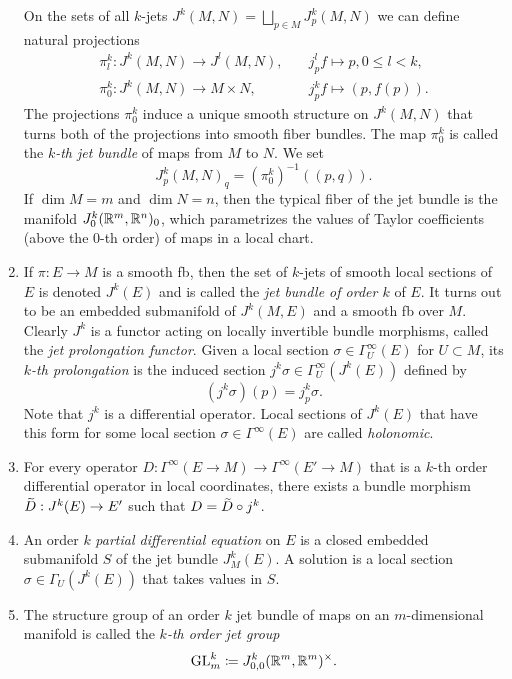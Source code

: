 \begin{defn}
\begin{enumerate}
        On the sets of all $k$-jets $J^k(M,N)=\bigsqcup_{p\in M}J^k_p(M,N)$ we can define natural projections
        \begin{align}
            \pi^k_l:J^k(M,N)\to J^l(M,N),&\quad  j_p^l f\mapsto p, 0\leq l<k,\\
            \pi^k_0:J^k(M,N)\to M\times N,&\quad j_p^k f\mapsto (p,f(p)).
        \end{align}
        The projections $\pi^k_0$ induce a unique smooth structure on $J^k(M,N)$ that turns both of the projections into smooth fiber bundles. The map $\pi^k_0$ is called the \emph{$k$-th jet bundle} of maps from $M$ to $N$.
        We set
        \[J^k_{p}(M,N)_q=(\pi^k_0)^{-1}((p,q)).\]
        If $\dim M=m$ and $\dim N=n$, then the typical fiber of the jet bundle is the manifold $J^k_{0}(\mathbb{R}^m,\mathbb{R}^n)_0$, which parametrizes the values of Taylor coefficients (above the $0$-th order) of maps in a local chart.
        \item If $\pi:E\to M$ is a smooth \gls{fb}, then the set of $k$-jets of smooth local sections of $E$ is denoted $J^k(E)$ and is called the \emph{jet bundle of order $k$} of $E$. It turns out to be an embedded submanifold of $J^k(M,E)$ and a smooth \gls{fb} over $M$. Clearly $J^k$ is a functor acting on locally invertible bundle morphisms, called the \emph{jet prolongation functor}. Given a local section $\sigma\in \Gamma_U^\infty(E)$ for $U\subset M$, its \emph{$k$-th prolongation} is the induced section $j^k\sigma\in\Gamma_U^\infty(J^k(E))$ defined by
        \[(j^k\sigma)(p)=j^k_p\sigma.\]
        Note that $j^k$ is a differential operator. Local sections of $J^k(E)$ that have this form for some local section $\sigma\in\Gamma^\infty(E)$ are called \emph{holonomic}.
        \item For every operator $D:\Gamma^\infty(E\to M)\to \Gamma^\infty(E'\to M)$ that is a $k$-th order differential operator in local coordinates, there exists a bundle morphism $\wt D:J^k(E)\to E'$ such that $D=\wt D\circ j^k$.
        \item An order $k$ \emph{partial differential equation} on $E$ is a closed embedded submanifold $S$ of the jet bundle $J^k_M(E)$. A solution is a local section $\sigma\in\Gamma_U(J^k(E))$ that takes values in $S$. 
        \item The structure group of an order $k$ jet bundle of maps on an $m$-dimensional manifold is called the \emph{$k$-th order jet group}
        \[\operatorname{GL}^k_m\coloneqq J^k_{0,0}(\mathbb{R}^m,\mathbb{R}^m)^\times.\]
    \end{enumerate}
\end{defn}

